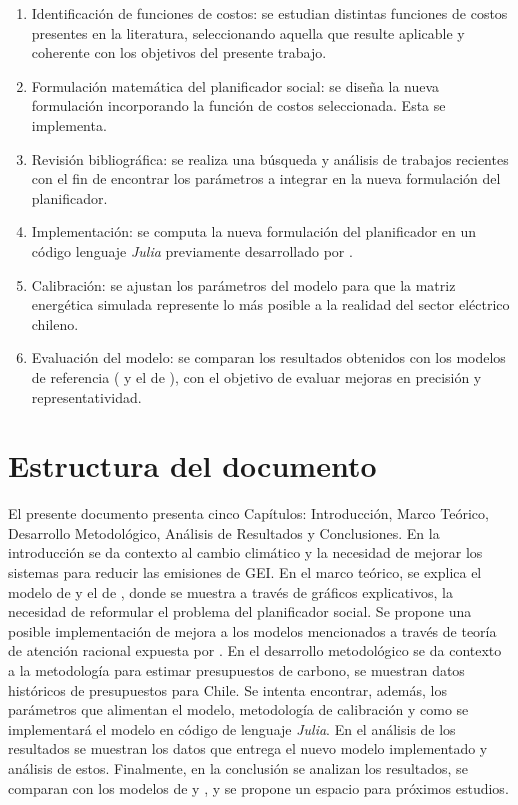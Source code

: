 \begin{enumerate}
    \item {Identificación de funciones de costos}: se estudian distintas funciones de costos presentes en la literatura, seleccionando aquella que resulte aplicable y coherente con los objetivos del presente trabajo.
    \item {Formulación matemática del planificador social}: se diseña la nueva formulación incorporando la función de costos seleccionada. Esta se implementa.
    \item {Revisión bibliográfica}: se realiza una búsqueda y análisis de trabajos recientes con el fin de encontrar los parámetros a integrar en la nueva formulación del planificador. 
    \item {Implementación}: se computa la nueva formulación del planificador en un código lenguaje \textit{Julia} previamente desarrollado por .
    \item {Calibración}: se ajustan los parámetros del modelo para que la matriz energética simulada represente lo más posible a la realidad del sector eléctrico chileno.
    \item {Evaluación del modelo}: se comparan los resultados obtenidos con los modelos de referencia ( y el de ), con el objetivo de evaluar mejoras en precisión y representatividad.
\end{enumerate}
\medskip
\section{Estructura del documento}

El presente documento presenta cinco Capítulos: Introducción, Marco Teórico, Desarrollo Metodológico, Análisis de Resultados y Conclusiones. En la introducción se da contexto al cambio climático y la necesidad de mejorar los sistemas para reducir las emisiones de GEI. En el marco teórico, se explica el modelo de  y el de , donde se muestra a través de gráficos explicativos, la necesidad de reformular el problema del planificador social. Se propone una posible implementación de mejora a los modelos mencionados a través de teoría de atención racional expuesta por . En el desarrollo metodológico se da contexto a la metodología para estimar presupuestos de carbono, se muestran datos históricos de presupuestos para Chile. Se intenta encontrar, además, los parámetros que alimentan el modelo, metodología de calibración y como se implementará el modelo en código de lenguaje \textit{Julia}. En el análisis de los resultados se muestran los datos que entrega el nuevo modelo implementado y análisis de estos. Finalmente, en la conclusión se analizan los resultados, se comparan con los modelos de  y , y se propone un espacio para próximos estudios.


